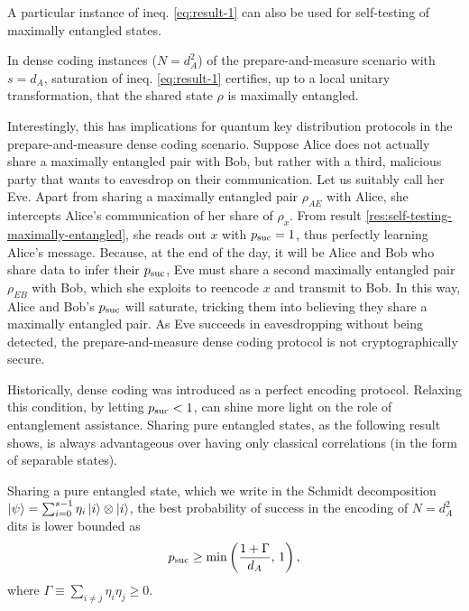         A particular instance of ineq. \ref{eq:result-1} can also be used for self-testing of maximally entangled states.
        \begin{result}
            In dense coding instances ($N=d_A^2$) of the prepare-and-measure scenario with $s=d_A$, saturation of ineq. \ref{eq:result-1} certifies, up to a local unitary transformation, that the shared state $\rho$ is maximally entangled.
            \label{res:self-testing-maximally-entangled}
        \end{result}
        
        Interestingly, this has implications for quantum key distribution protocols in the prepare-and-measure dense coding scenario. Suppose Alice does not actually share a maximally entangled pair with Bob, but rather with a third, malicious party that wants to eavesdrop on their communication. Let us suitably call her Eve. Apart from sharing a maximally entangled pair $\rho_{AE}$ with Alice, she intercepts Alice's communication of her share of $\rho_x$. From result \ref{res:self-testing-maximally-entangled}, she reads out $x$ with $p_{\text{suc}} = 1$, thus perfectly learning Alice's message. Because, at the end of the day, it will be Alice and Bob who share data to infer their $p_{\text{suc}}$, Eve must share a second maximally entangled pair $\rho_{EB}$ with Bob, which she exploits to reencode $x$ and transmit to Bob. In this way, Alice and Bob's $p_{\text{suc}}$ will saturate, tricking them into believing they share a maximally entangled pair. As Eve succeeds in eavesdropping without being detected, the prepare-and-measure dense coding protocol is not cryptographically secure.
        
        Historically, dense coding was introduced as a perfect encoding protocol. Relaxing this condition, by letting $p_{\text{suc}} < 1$, can shine more light on the role of entanglement assistance. Sharing pure entangled states, as the following result shows, is always advantageous over having only classical correlations (in the form of separable states).
        \begin{result}
            Sharing a pure entangled state, which we write in the Schmidt decomposition $\ket{\psi} = \sum_{i = 0}^{s-1} \eta_i \ket{i} \otimes \ket{i}$, the best probability of success in the encoding of $N = d_A^2$ dits is lower bounded as
            $$
                p_{\text{suc}} \geq \min \left( \frac{1 + \Gamma}{d_A}, \,1 \right),
            $$
            where $\Gamma \equiv \sum_{i \neq j} \eta_i \eta_j \geq 0$.
        \end{result}
        
